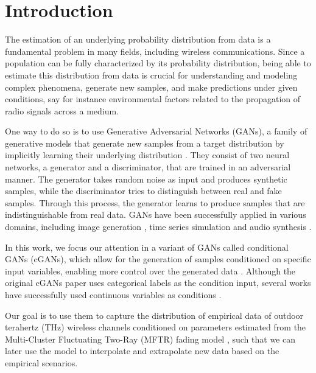 \section{Introduction}

The estimation of an underlying probability distribution from data is a fundamental problem in many fields, including wireless communications. Since a population can be fully characterized by its probability distribution, being able to estimate this distribution from data is crucial for understanding and modeling complex phenomena, generate new samples, and make predictions under given conditions, say for instance environmental factors related to the propagation of radio signals across a medium.

One way to do so is to use Generative Adversarial Networks (GANs), a family of generative models that generate new samples from a target distribution by implicitly learning their underlying distribution \cite{goodfellow2014generativeadversarialnetworks}. They consist of two neural networks, a generator and a discriminator, that are trained in an adversarial manner. The generator takes random noise as input and produces synthetic samples, while the discriminator tries to distinguish between real and fake samples. Through this process, the generator learns to produce samples that are indistinguishable from real data. GANs have been successfully applied in various domains, including image generation \cite{karras2019stylebasedgeneratorarchitecturegenerative}, time series simulation \cite{fu2019time} and audio synthesis \cite{donahue2019adversarialaudiosynthesis}.

In this work, we focus our attention in a variant of GANs called conditional GANs (cGANs), which allow for the generation of samples conditioned on specific input variables, enabling more control over the generated data \cite{mirza2014conditional}. Although the original cGANs paper uses categorical labels as the condition input, several works have successfully used continuous variables as conditions \cite{fu2019time}\cite{zaheer2017gan}.

Our goal is to use them to capture the distribution of empirical data of outdoor terahertz (THz) wireless channels \cite{papasotiriou2022stochastic} conditioned on parameters estimated from the Multi-Cluster Fluctuating Two-Ray (MFTR) fading model \cite{sánchez2023multiclusterfluctuatingtworayfading}, such that we can later use the model to interpolate and extrapolate new data based on the empirical scenarios.

